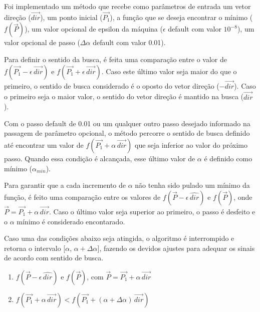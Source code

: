 \documentclass[10pt, a4paper]{article}
\begin{document}
Foi implementado um método que recebe como parâmetros de entrada um vetor direção ($\overrightarrow{dir}$), um ponto inicial ($\overrightarrow{P_1}$), 
a função que se deseja encontrar o mínimo ($f(\overrightarrow{P})$), um valor opcional de epsilon da máquina ($\epsilon$ default com valor $10^{-8}$), um valor opcional de passo ($\Delta\alpha$ default com valor 0.01).

Para definir o sentido da busca, é feita uma comparação entre o valor de $f(\overrightarrow{P_1}-\epsilon\,\overrightarrow{dir})$ e $f(\overrightarrow{P_1}+\epsilon\,\overrightarrow{dir})$.
Caso este último valor seja maior do que o primeiro, o sentido de busca considerado é o oposto do vetor direção ($-\overrightarrow{dir}$). Caso o primeiro seja
o maior valor, o sentido do vetor direção é mantido na busca ($\overrightarrow{dir}$).

Com o passo default de 0.01 ou um qualquer outro passo desejado informado na passagem de parâmetro opcional, o método percorre o sentido
de busca definido até encontrar um valor de $f(\overrightarrow{P_1}+ \alpha\,\overrightarrow{dir})$ que seja inferior ao valor do próximo passo.
Quando essa condição é alcançada, esse último valor de $\alpha$ é definido como mínimo ($\alpha_{min}$). 

Para garantir que a cada incremento
de $\alpha$ não tenha sido pulado um mínimo da função, é feito uma comparação entre os valores de $f(\overrightarrow{P}-\epsilon\,\hat{dir})$ e $f(\overrightarrow{P})$, 
onde $\overrightarrow{P} = \overrightarrow{P_1} + \alpha\,\overrightarrow{dir}$. Caso o último valor seja superior ao primeiro, o passo é desfeito e o $\alpha$ mínimo é considerado encontarado.

Caso uma das condições abaixo seja atingida, o algoritmo é interrompido e  retorna o intervalo [$\alpha$,  $\alpha + \Delta\alpha$], fazendo os devidos ajustes para adequar os sinais de acordo com sentido de busca.
\begin{enumerate}
  \item $f(\overrightarrow{P}-\epsilon\,\hat{dir})$ e $f(\overrightarrow{P})$, com $\overrightarrow{P} = \overrightarrow{P_1} + \alpha\,\overrightarrow{dir}$
  \item $f(\overrightarrow{P_1}+ \alpha\,\overrightarrow{dir}) < f(\overrightarrow{P_1}+ (\alpha + \Delta\alpha)\,\overrightarrow{dir})$  
\end{enumerate}
\end{document}
